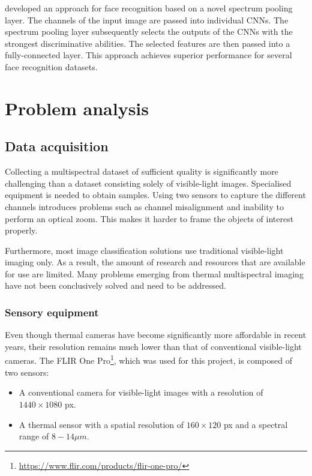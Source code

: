 \documentclass{l4proj}
\begin{document}
\citet{wu_intraspectrum_2020} developed an approach for face recognition based on a novel spectrum pooling layer. The channels of the input image are passed into individual CNNs. The spectrum pooling layer subsequently selects the outputs of the CNNs with the strongest discriminative abilities. The selected features are then passed into a fully-connected layer. This approach achieves superior performance for several face recognition datasets.


\chapter{Problem analysis}
\label{analysis}

\section{Data acquisition}

Collecting a multispectral dataset of sufficient quality is significantly more challenging than a dataset consisting solely of visible-light images. Specialised equipment is needed to obtain samples. Using two sensors to capture the different channels introduces problems such as channel misalignment and inability to perform an optical zoom. This makes it harder to frame the objects of interest properly.

Furthermore, most image classification solutions use traditional visible-light imaging only. As a result, the amount of research and resources that are available for use are limited. Many problems emerging from thermal multispectral imaging have not been conclusively solved and need to be addressed.

\subsection{Sensory equipment}
\label{sensory_equipment}

Even though thermal cameras have become significantly more affordable in recent years, their resolution remains much lower than that of conventional visible-light cameras. The FLIR One Pro\footnote{\url{https://www.flir.com/products/flir-one-pro/}}, which was used for this project, is composed of two sensors:

\begin{itemize}
  \item A conventional camera for visible-light images with a resolution of $1440 \times 1080$ px.
  \item A thermal sensor with a spatial resolution of $160 \times 120$ px and a spectral range of $8 - 14 \mu m$.
\end{itemize}
\end{document}
